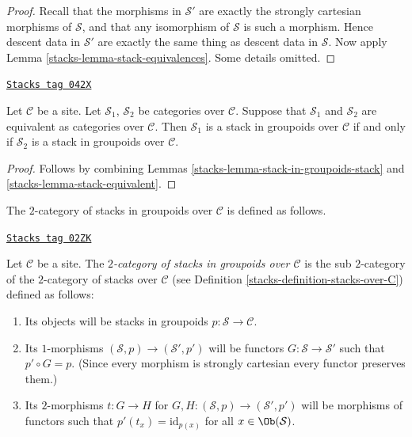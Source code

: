 \begin{proof}

Recall that the morphisms in $\mathcal{S}'$ are exactly the
strongly cartesian morphisms of $\mathcal{S}$, and that any isomorphism of
$\mathcal{S}$ is such a morphism. Hence descent data in $\mathcal{S}'$
are exactly the same thing as descent data in $\mathcal{S}$. Now apply
Lemma \ref{stacks-lemma-stack-equivalences}. Some details omitted.
\end{proof}

\begin{lemma}
\label{stacks-lemma-stack-in-groupoids-equivalent}
\href{https://stacks.math.columbia.edu/tag/042X}{\texttt{Stacks tag 042X}}

Let $\mathcal{C}$ be a site.
Let $\mathcal{S}_1$, $\mathcal{S}_2$ be categories over $\mathcal{C}$.
Suppose that $\mathcal{S}_1$ and $\mathcal{S}_2$ are equivalent
as categories over $\mathcal{C}$.
Then $\mathcal{S}_1$ is a stack in groupoids over $\mathcal{C}$ if and only if
$\mathcal{S}_2$ is a stack in groupoids over $\mathcal{C}$.
\end{lemma}

\begin{proof}

Follows by combining
Lemmas \ref{stacks-lemma-stack-in-groupoids-stack} and \ref{stacks-lemma-stack-equivalent}.
\end{proof}

The $2$-category of stacks in groupoids over $\mathcal{C}$
is defined as follows.

\begin{definition}
\label{stacks-definition-stacks-in-groupoids-over-C}
\href{https://stacks.math.columbia.edu/tag/02ZK}{\texttt{Stacks tag 02ZK}}

Let $\mathcal{C}$ be a site.
The {\it $2$-category of stacks in groupoids over $\mathcal{C}$}
is the sub $2$-category of the $2$-category of stacks
over $\mathcal{C}$ (see Definition \ref{stacks-definition-stacks-over-C})
defined as follows:
\begin{enumerate}
\item Its objects will be stacks in groupoids
$p : \mathcal{S} \to \mathcal{C}$.
\item Its $1$-morphisms $(\mathcal{S}, p) \to (\mathcal{S}', p')$
will be functors $G : \mathcal{S} \to \mathcal{S}'$ such that
$p' \circ G = p$. (Since every morphism is strongly cartesian
every functor preserves them.)
\item Its $2$-morphisms $t : G \to H$ for
$G, H : (\mathcal{S}, p) \to (\mathcal{S}', p')$
will be morphisms of functors
such that $p'(t_x) = \text{id}_{p(x)}$
for all $x \in \Ob(\mathcal{S})$.
\end{enumerate}
\end{definition}

